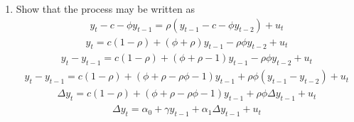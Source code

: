 \documentclass[12pt]{article}
\begin{document}
\begin{enumerate}
    \item Show that the process may be written as
          \begin{align*}
              y_{t} - c - \phi y_{t-1} = \rho \left( y_{t-1} - c - \phi y_{t-2} \right) + u_{t}
          \end{align*}
          \begin{align*}
              y_{t} = c \left( 1 - \rho \right) + \left( \phi + \rho \right) y_{t-1} - \rho \phi y_{t-2} + u_{t}
          \end{align*}
          \begin{align*}
              y_{t} - y_{t-1} = c \left( 1 - \rho \right) + \left( \phi + \rho - 1 \right) y_{t-1} - \rho \phi y_{t-2} + u_{t}
          \end{align*}
          \begin{align*}
              y_{t} - y_{t-1} = c \left( 1 - \rho \right) + \left( \phi + \rho - \rho \phi - 1 \right) y_{t-1} + \rho \phi \left( y_{t-1} - y_{t-2} \right) + u_{t}
          \end{align*}
          \begin{align*}
              \Delta y_{t} = c \left( 1 - \rho \right) + \left( \phi + \rho - \rho \phi - 1 \right) y_{t-1} + \rho \phi \Delta y_{t-1} + u_{t}
          \end{align*}
          \begin{align*}
              \Delta y_{t} = \alpha_0 + \gamma y_{t-1} + \alpha_1 \Delta y_{t-1} + u_{t}
          \end{align*}
\end{enumerate}

\end{document}
